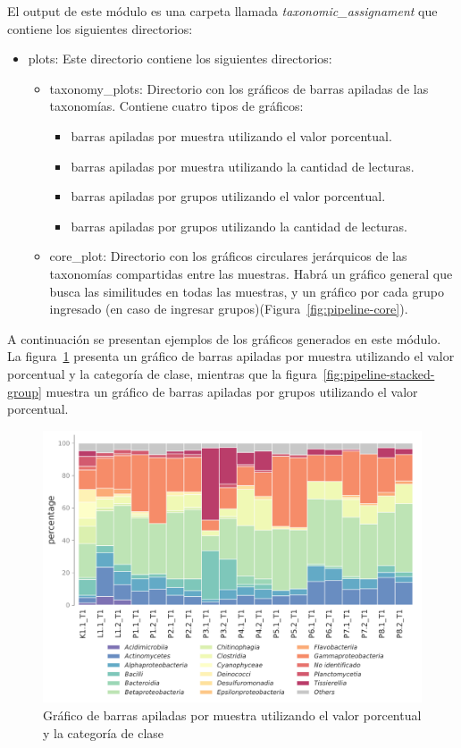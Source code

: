 El output de este módulo es una carpeta llamada \textit{taxonomic\_assignament} que contiene los siguientes directorios:
\begin{itemize}
\item plots: Este directorio contiene los siguientes directorios:
\begin{itemize}
    \item taxonomy\_plots: Directorio con los gráficos de barras apiladas de las taxonomías. Contiene cuatro tipos de gráficos: 
    \begin{itemize}
        \item barras apiladas por muestra utilizando el valor porcentual.
        \item barras apiladas por muestra utilizando la cantidad de lecturas.
        \item barras apiladas por grupos utilizando el valor porcentual.
        \item barras apiladas por grupos utilizando la cantidad de lecturas.
    \end{itemize}
    \item core\_plot: Directorio con los gráficos circulares jerárquicos de las taxonomías compartidas entre las muestras. Habrá un gráfico general que busca las similitudes en todas las muestras, y un gráfico por cada grupo ingresado (en caso de ingresar grupos)(Figura~\ref{fig:pipeline-core}).
\end{itemize}
 \end{itemize}
A continuación se presentan ejemplos de los gráficos generados en este módulo. La figura~\ref{fig:pipeline-stacked-sample} presenta un gráfico de barras apiladas por muestra utilizando el valor porcentual y la categoría de clase, mientras que la figura~\ref{fig:pipeline-stacked-group} muestra un gráfico de barras apiladas por grupos utilizando el valor porcentual.
\begin{figure}[H]
    \centering
    \includegraphics[width=1\linewidth,height=0.4\textheight]{images/pipeline/class_samples_percentage.pdf}
    \caption{Gráfico de barras apiladas por muestra utilizando el valor porcentual y la categoría de clase}
    \label{fig:pipeline-stacked-sample}
\end{figure}
